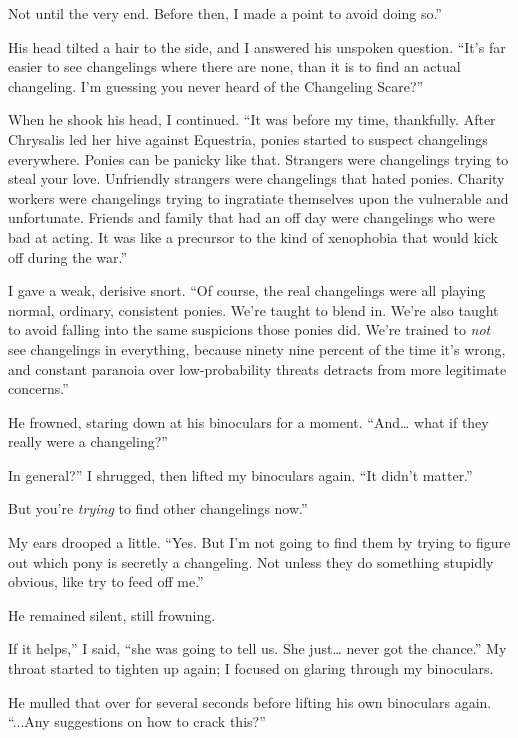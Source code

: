 \leavevmode{}Not until the very end. Before then, I made a point to avoid doing so.”

His head tilted a hair to the side, and I answered his unspoken question. “It’s far easier to see changelings where there are none, than it is to find an actual changeling. I’m guessing you never heard of the Changeling Scare?”

When he shook his head, I continued. “It was before my time, thankfully. After Chrysalis led her hive against Equestria, ponies started to suspect changelings everywhere. Ponies can be panicky like that. Strangers were changelings trying to steal your love. Unfriendly strangers were changelings that hated ponies. Charity workers were changelings trying to ingratiate themselves upon the vulnerable and unfortunate. Friends and family that had an off day were changelings who were bad at acting. It was like a precursor to the kind of xenophobia that would kick off during the war.”

I gave a weak, derisive snort. “Of course, the real changelings were all playing normal, ordinary, consistent ponies. We’re taught to blend in. We’re also taught to avoid falling into the same suspicions those ponies did. We’re trained to \textit{not} see changelings in everything, because ninety nine percent of the time it’s wrong, and constant paranoia over low-probability threats detracts from more legitimate concerns.”

He frowned, staring down at his binoculars for a moment. “And… what if they really were a changeling?”

\leavevmode{}In general?” I shrugged, then lifted my binoculars again. “It didn’t matter.”

\leavevmode{}But you’re \textit{trying} to find other changelings now.”

My ears drooped a little. “Yes. But I’m not going to find them by trying to figure out which pony is secretly a changeling. Not unless they do something stupidly obvious, like try to feed off me.”

He remained silent, still frowning.

\leavevmode{}If it helps,” I said, “she was going to tell us. She just… never got the chance.” My throat started to tighten up again; I focused on glaring through my binoculars.

He mulled that over for several seconds before lifting his own binoculars again. “...Any suggestions on how to crack this?”

